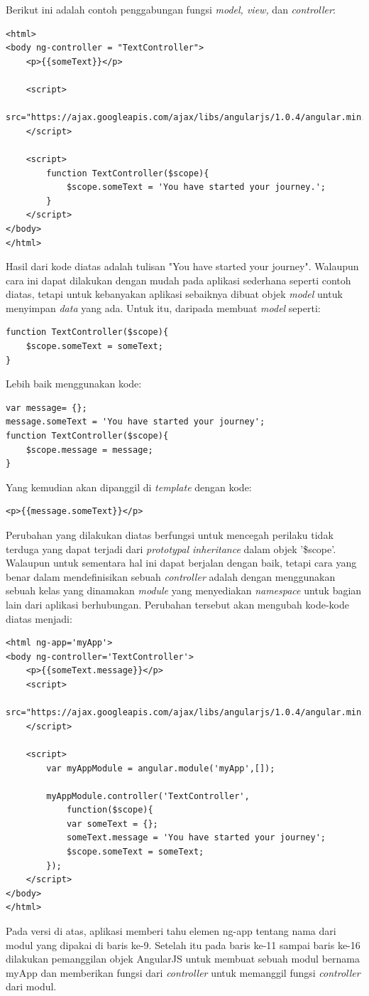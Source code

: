 	Berikut ini adalah contoh penggabungan fungsi \textit{model, view,} dan \textit{controller}:
\begin{lstlisting}
<html>
<body ng-controller = "TextController">
	<p>{{someText}}</p>
	
	<script>
		src="https://ajax.googleapis.com/ajax/libs/angularjs/1.0.4/angular.min.js">
	</script>
	
	<script>
		function TextController($scope){
			$scope.someText = 'You have started your journey.';
		}
	</script>
</body>
</html>
\end{lstlisting}
	
	Hasil dari kode diatas adalah tulisan "You have started your journey". Walaupun cara ini dapat dilakukan dengan mudah pada aplikasi sederhana seperti contoh diatas, tetapi untuk kebanyakan aplikasi sebaiknya dibuat objek \textit{model} untuk menyimpan \textit{data} yang ada. Untuk itu, daripada membuat \textit{model} seperti:
	
\begin{lstlisting}
function TextController($scope){
	$scope.someText = someText;
}
\end{lstlisting}
	
	Lebih baik menggunakan kode:
\begin{lstlisting}
var message= {};
message.someText = 'You have started your journey';
function TextController($scope){
	$scope.message = message;
}
\end{lstlisting}
	Yang kemudian akan dipanggil di \textit{template} dengan kode:
\begin{lstlisting}
<p>{{message.someText}}</p>
\end{lstlisting}
	Perubahan yang dilakukan diatas berfungsi untuk mencegah perilaku tidak terduga yang dapat terjadi dari \textit{prototypal inheritance} dalam objek '\$scope'. Walaupun untuk sementara hal ini dapat berjalan dengan baik, tetapi cara yang benar dalam mendefinisikan sebuah \textit{controller} adalah dengan menggunakan sebuah kelas yang dinamakan \textit{module} yang menyediakan \textit{namespace} untuk bagian lain dari aplikasi berhubungan. Perubahan tersebut akan mengubah kode-kode diatas menjadi:
	\begin{lstlisting}
<html ng-app='myApp'>
<body ng-controller='TextController'>
	<p>{{someText.message}}</p>
	<script>
		src="https://ajax.googleapis.com/ajax/libs/angularjs/1.0.4/angular.min.js">
	</script>
	
	<script>
		var myAppModule = angular.module('myApp',[]);
		
		myAppModule.controller('TextController',
			function($scope){
			var someText = {};
			someText.message = 'You have started your journey';
			$scope.someText = someText;
		});
	</script>
</body>
</html>
	\end{lstlisting}
	Pada versi di atas, aplikasi memberi tahu elemen ng-app tentang nama dari modul yang dipakai di baris ke-9. Setelah itu pada baris ke-11 sampai baris ke-16 dilakukan pemanggilan objek AngularJS untuk membuat sebuah modul bernama myApp dan memberikan fungsi dari \textit{controller} untuk memanggil fungsi \textit{controller} dari modul.
	
